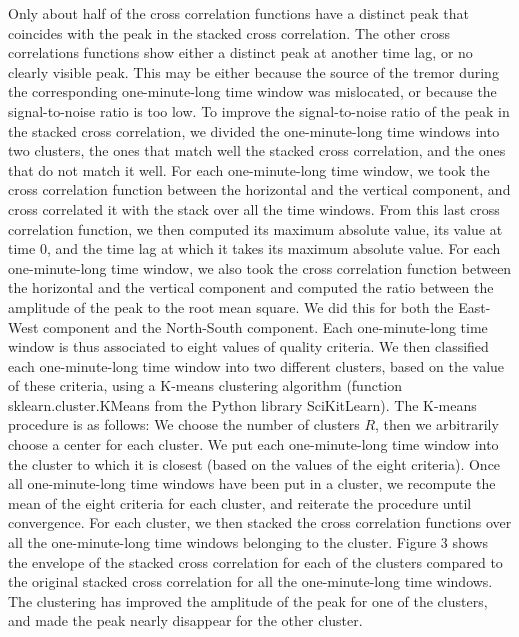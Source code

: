 \documentclass[draft]{agujournal2019}
\begin{document}
Only about half of the cross correlation functions have a distinct peak that coincides with the peak in the stacked cross correlation. The other cross correlations functions show either a distinct peak at another time lag, or no clearly visible peak. This may be either because the source of the tremor during the corresponding one-minute-long time window was mislocated, or because the signal-to-noise ratio is too low. To improve the signal-to-noise ratio of the peak in the stacked cross correlation, we divided the one-minute-long time windows into two clusters, the ones that match well the stacked cross correlation, and the ones that do not match it well. For each one-minute-long time window, we took the cross correlation function between the horizontal and the vertical component, and cross correlated it with the stack over all the time windows. From this last cross correlation function, we then computed its maximum absolute value, its value at time 0, and the time lag at which it takes its maximum absolute value. For each one-minute-long time window, we also took the cross correlation function between the horizontal and the vertical component and computed the ratio between the amplitude of the peak to the root mean square. We did this for both the East-West component and the North-South component. Each one-minute-long time window is thus associated to eight values of quality criteria. We then classified each one-minute-long time window into two different clusters, based on the value of these criteria, using a K-means clustering algorithm (function sklearn.cluster.KMeans from the Python library SciKitLearn). The K-means procedure is as follows: We choose the number of clusters $R$, then we arbitrarily choose a center for each cluster. We put each one-minute-long time window into the cluster to which it is closest (based on the values of the eight criteria). Once all one-minute-long time windows have been put in a cluster, we recompute the mean of the eight criteria for each cluster, and reiterate the procedure until convergence. For each cluster, we then stacked the cross correlation functions over all the one-minute-long time windows belonging to the cluster. Figure 3 shows the envelope of the stacked cross correlation for each of the clusters compared to the original stacked cross correlation for all the one-minute-long time windows. The clustering has improved the amplitude of the peak for one of the clusters, and made the peak nearly disappear for the other cluster. \\
\end{document}
